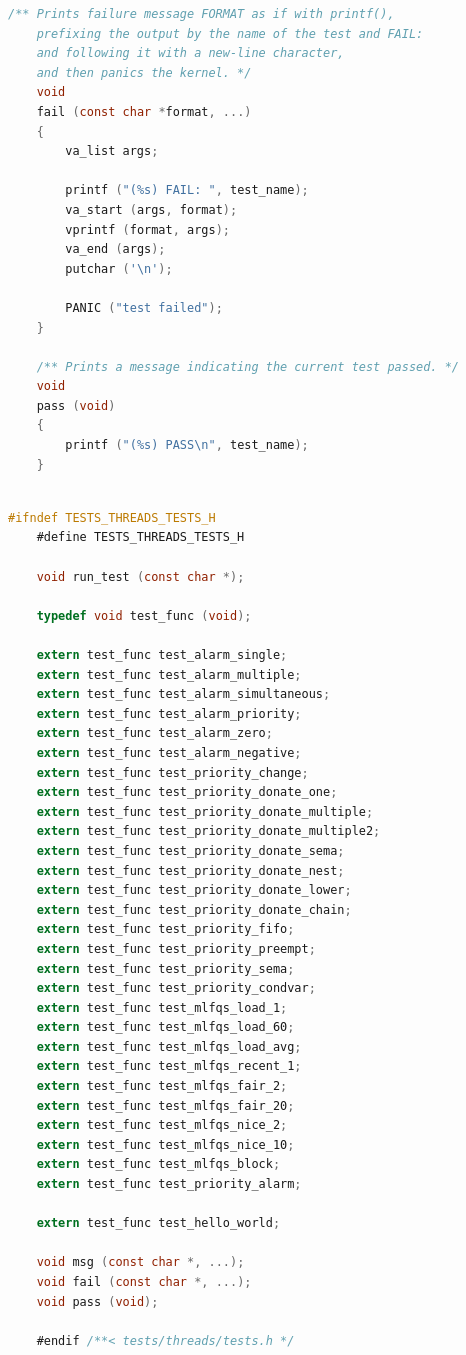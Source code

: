 \documentclass{article}
\begin{document}
\begin{lstlisting}[language=C, title=\texttt{pintos/src/tests/threads/tests.c}]
	/** Prints failure message FORMAT as if with printf(),
	prefixing the output by the name of the test and FAIL:
	and following it with a new-line character,
	and then panics the kernel. */
	void
	fail (const char *format, ...) 
	{
		va_list args;
		
		printf ("(%s) FAIL: ", test_name);
		va_start (args, format);
		vprintf (format, args);
		va_end (args);
		putchar ('\n');
		
		PANIC ("test failed");
	}
	
	/** Prints a message indicating the current test passed. */
	void
	pass (void) 
	{
		printf ("(%s) PASS\n", test_name);
	}
	
\end{lstlisting}

\begin{lstlisting}[language=C, title=\texttt{pintos/src/tests/threads/tests.h}]
	#ifndef TESTS_THREADS_TESTS_H
	#define TESTS_THREADS_TESTS_H
	
	void run_test (const char *);
	
	typedef void test_func (void);
	
	extern test_func test_alarm_single;
	extern test_func test_alarm_multiple;
	extern test_func test_alarm_simultaneous;
	extern test_func test_alarm_priority;
	extern test_func test_alarm_zero;
	extern test_func test_alarm_negative;
	extern test_func test_priority_change;
	extern test_func test_priority_donate_one;
	extern test_func test_priority_donate_multiple;
	extern test_func test_priority_donate_multiple2;
	extern test_func test_priority_donate_sema;
	extern test_func test_priority_donate_nest;
	extern test_func test_priority_donate_lower;
	extern test_func test_priority_donate_chain;
	extern test_func test_priority_fifo;
	extern test_func test_priority_preempt;
	extern test_func test_priority_sema;
	extern test_func test_priority_condvar;
	extern test_func test_mlfqs_load_1;
	extern test_func test_mlfqs_load_60;
	extern test_func test_mlfqs_load_avg;
	extern test_func test_mlfqs_recent_1;
	extern test_func test_mlfqs_fair_2;
	extern test_func test_mlfqs_fair_20;
	extern test_func test_mlfqs_nice_2;
	extern test_func test_mlfqs_nice_10;
	extern test_func test_mlfqs_block;
	extern test_func test_priority_alarm;
	
	extern test_func test_hello_world;
	
	void msg (const char *, ...);
	void fail (const char *, ...);
	void pass (void);
	
	#endif /**< tests/threads/tests.h */
	
\end{lstlisting}
\end{document}
